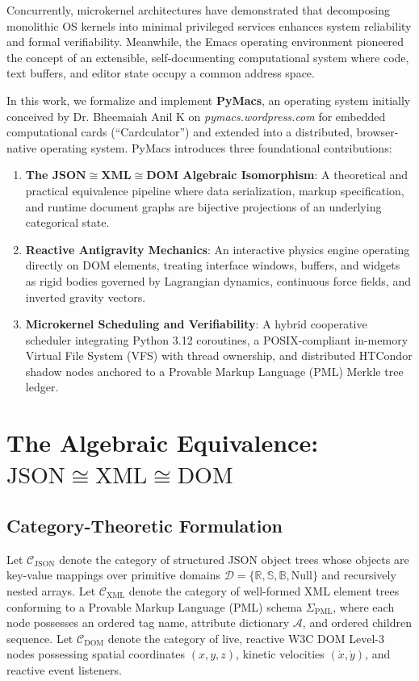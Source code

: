 \documentclass[10pt,twocolumn,letterpaper]{article}
\begin{document}
Concurrently, microkernel architectures \cite{liedtke1995microkernel} have demonstrated that decomposing monolithic OS kernels into minimal privileged services enhances system reliability and formal verifiability. Meanwhile, the Emacs operating environment \cite{stallman1981emacs} pioneered the concept of an extensible, self-documenting computational system where code, text buffers, and editor state occupy a common address space.

In this work, we formalize and implement \textbf{PyMacs}, an operating system initially conceived by Dr. Bheemaiah Anil K on \textit{pymacs.wordpress.com} for embedded computational cards (``Cardculator'') and extended into a distributed, browser-native operating system. PyMacs introduces three foundational contributions:

\begin{enumerate}
    \item \textbf{The $\mathbf{JSON \cong XML \cong DOM}$ Algebraic Isomorphism}: A theoretical and practical equivalence pipeline where data serialization, markup specification, and runtime document graphs are bijective projections of an underlying categorical state.
    \item \textbf{Reactive Antigravity Mechanics}: An interactive physics engine operating directly on DOM elements, treating interface windows, buffers, and widgets as rigid bodies governed by Lagrangian dynamics, continuous force fields, and inverted gravity vectors.
    \item \textbf{Microkernel Scheduling and Verifiability}: A hybrid cooperative scheduler integrating Python 3.12 coroutines, a POSIX-compliant in-memory Virtual File System (VFS) with thread ownership, and distributed HTCondor shadow nodes anchored to a Provable Markup Language (PML) Merkle tree ledger.
\end{enumerate}

\section{The Algebraic Equivalence: $\mathrm{JSON} \cong \mathrm{XML} \cong \mathrm{DOM}$}

\subsection{Category-Theoretic Formulation}
Let $\mathcal{C}_{\mathrm{JSON}}$ denote the category of structured JSON object trees whose objects are key-value mappings over primitive domains $\mathcal{D} = \{\mathbb{R}, \mathbb{S}, \mathbb{B}, \mathrm{Null}\}$ and recursively nested arrays. Let $\mathcal{C}_{\mathrm{XML}}$ denote the category of well-formed XML element trees conforming to a Provable Markup Language (PML) schema $\Sigma_{\mathrm{PML}}$, where each node possesses an ordered tag name, attribute dictionary $\mathcal{A}$, and ordered children sequence. Let $\mathcal{C}_{\mathrm{DOM}}$ denote the category of live, reactive W3C DOM Level-3 nodes possessing spatial coordinates $(x, y, z)$, kinetic velocities $(\dot{x}, \dot{y})$, and reactive event listeners.
\end{document}
